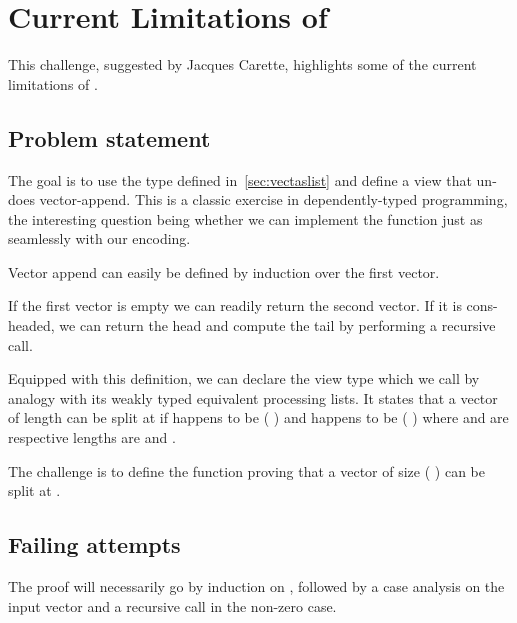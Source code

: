 \section{Current Limitations of \idris{}}\label{appendix:limitations}

This challenge, suggested by Jacques Carette, highlights some of the current
limitations of \idris{}.

\subsection{Problem statement}

The goal is to use the  type defined in~\cref{sec:vectaslist}
and define a view that un-does vector-append.
%
This is a classic exercise in dependently-typed programming, the interesting
question being whether we can implement the function just as seamlessly with
our encoding.

Vector append can easily be defined by induction over the first vector.


If the first vector is empty we can readily return the second vector.
%
If it is cons-headed, we can return the head and compute the tail by performing
a recursive call.

Equipped with this definition, we can declare the view type which we call
 by analogy with its weakly typed equivalent processing
lists.
%
It states that a vector  of length  can be split
at  if
 happens to be
( \IdrisFunction{+} )
and  happens to be
( \IdrisFunction{++} )
where  and  are
respective lengths are  and .


The challenge is to define the function proving that a vector of size
( \IdrisFunction{+} ) can be split at
.

\subsection{Failing attempts}

The proof will necessarily go by induction on , followed by
a case analysis on the input vector and a recursive call in the non-zero
case.

